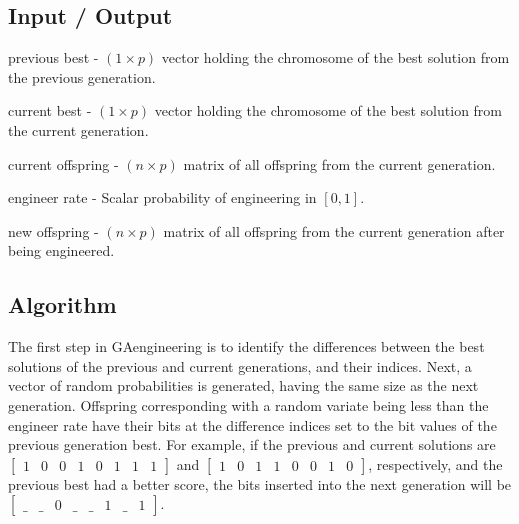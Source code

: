 \documentclass{book}
\newcommand{\textcode}[1]{\textsf{\small #1}}   %
\begin{document}
\subsection*{Input / Output}

\begin{compactitem}

\item \textcode{previous best} - $\left( 1 \times p \right)$ vector holding the chromosome of the best solution from the previous generation.

\item \textcode{current best} - $\left( 1 \times p \right)$ vector holding the chromosome of the best solution from the current generation.

\item \textcode{current offspring} - $\left( n \times p \right)$ matrix of all offspring from the current generation.

\item \textcode{engineer rate} - Scalar probability of engineering in $\left[ 0,1 \right]$.

\item \textcode{new offspring} - $\left( n \times p \right)$ matrix of all offspring from the current generation after being engineered.

\end{compactitem}

\subsection*{Algorithm}

The first step in \textcode{GAengineering} is to identify the
differences between the best solutions of the previous and
current generations, and their indices. Next, a vector of
random probabilities is generated, having the same size as the
next generation. Offspring corresponding with a random variate
being less than the engineer rate have their bits at the
difference indices set to the bit values of the previous
generation best. For example, if the previous and current solutions are $%
\begin{bmatrix}
1 & 0 & 0 & 1 & 0 & 1 & 1 & 1%
\end{bmatrix}%
$ and $%
\begin{bmatrix}
1 & 0 & 1 & 1 & 0 & 0 & 1 & 0%
\end{bmatrix}%
$, respectively, and the previous best had a better score, the bits inserted
into the next generation will be $%
\begin{bmatrix}
\_ & \_ & 0 & \_ & \_ & 1 & \_ & 1%
\end{bmatrix}%
$.
\end{document}
